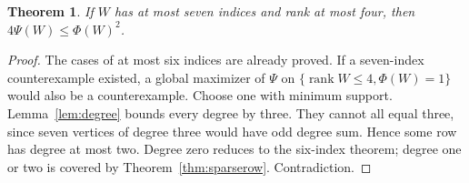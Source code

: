 \documentclass[11pt]{article}
\newtheorem{theorem}{Theorem}[section]
\begin{document}
\begin{theorem}\label{thm:seven}
If $W$ has at most seven indices and rank at most four, then $4\Psi(W)\leq\Phi(W)^2$.
\end{theorem}
\begin{proof}
The cases of at most six indices are already proved. If a seven-index counterexample existed, a global maximizer of $\Psi$ on $\{\operatorname{rank}W\leq4,\Phi(W)=1\}$ would also be a counterexample. Choose one with minimum support. Lemma~\ref{lem:degree} bounds every degree by three. They cannot all equal three, since seven vertices of degree three would have odd degree sum. Hence some row has degree at most two. Degree zero reduces to the six-index theorem; degree one or two is covered by Theorem~\ref{thm:sparserow}. Contradiction.
\end{proof}
\end{document}
